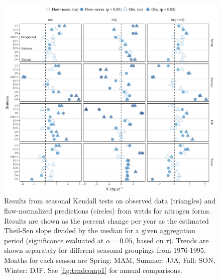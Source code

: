 \documentclass[letterpaper,12pt,oneside]{article}\usepackage[]{graphicx}\usepackage[]{color}
\begin{document}
\begin{figure}
\centering
\includegraphics[width=1\textwidth,page=1]{figs/trndcomp2.pdf}
\caption{Results from seasonal Kendall tests on observed data (triangles) and flow-normalized predictions (circles) from \ac{wrtds} for nitrogen forms. Results are shown as the percent change per year as the estimated Theil-Sen slope divided by the median for a given aggregation period (significance evaluated at $\alpha = 0.05$, based on $\tau$). Trends are shown separately for different seasonal groupings from 1976-1995. Months for each season are Spring: MAM, Summer: JJA, Fall: SON, Winter: DJF. See \cref{fig:trndcomp1} for annual comparisons.}
\label{fig:trndcomp2}   
\end{figure}
\end{document}
